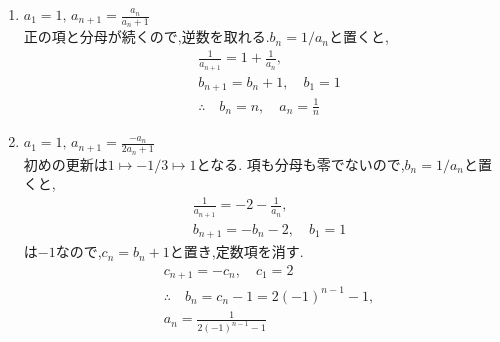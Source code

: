     \noindent{}\par\nobreak
    \begin{enumerate}[label=(\arabic*),parsep=3pt,format=\bookitemlink{example-reciprocal-1}{solution}{problem}]
      \item $\displaystyle a_1=1,\, a_{n+1}=\frac{a_n}{a_n+1}$\\
            正の項と分母が続くので,逆数を取れる.$b_n=1/a_n$と置くと,
            \begin{align*}
              &\frac{1}{a_{n+1}}=1+\frac{1}{a_n},\\
              &b_{n+1}=b_n+1,\quad b_1=1\\
              &\therefore \quad b_n=n,\quad a_n=\frac1n
            \end{align*}
      \item $\displaystyle a_1=1,\, a_{n+1}=\frac{-a_n}{2a_n+1}$\\
            初めの更新は$1\longmapsto-1/3\longmapsto1$となる.
            項も分母も零でないので,$b_n=1/a_n$と置くと,
            \begin{align*}
              &\frac{1}{a_{n+1}}=-2-\frac{1}{a_n},\\
              &b_{n+1}=-b_n-2,\quad b_1=1
            \end{align*}
            は$-1$なので,$c_n=b_n+1$と置き,定数項を消す.
            \begin{align*}
              &c_{n+1}=-c_n,\quad c_1=2\\
              &\therefore \quad b_n=c_n-1=2(-1)^{n-1}-1,\\
              &a_n=\frac{1}{2(-1)^{n-1}-1}
            \end{align*}
    \end{enumerate}
